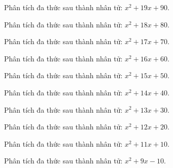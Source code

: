 \begin{bt}
	Phân tích đa thức sau thành nhân tử: $x^2 + 19 x + 90$.
\end{bt}
\begin{bt}
	Phân tích đa thức sau thành nhân tử: $x^2 + 18 x + 80$.
\end{bt}
\begin{bt}
	Phân tích đa thức sau thành nhân tử: $x^2 + 17 x + 70$.
\end{bt}
\begin{bt}
	Phân tích đa thức sau thành nhân tử: $x^2 + 16 x + 60$.
\end{bt}
\begin{bt}
	Phân tích đa thức sau thành nhân tử: $x^2 + 15 x + 50$.
\end{bt}
\begin{bt}
	Phân tích đa thức sau thành nhân tử: $x^2 + 14 x + 40$.
\end{bt}
\begin{bt}
	Phân tích đa thức sau thành nhân tử: $x^2 + 13 x + 30$.
\end{bt}
\begin{bt}
	Phân tích đa thức sau thành nhân tử: $x^2 + 12 x + 20$.
\end{bt}
\begin{bt}
	Phân tích đa thức sau thành nhân tử: $x^2 + 11 x + 10$.
\end{bt}
\begin{bt}
	Phân tích đa thức sau thành nhân tử: $x^2 + 9 x - 10$.
\end{bt}
